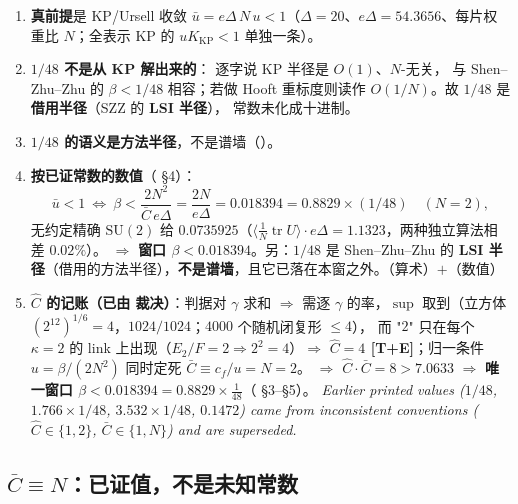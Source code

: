 \begin{enumerate}[label=(\alph*)]
\item \textbf{真前提}是 KP/Ursell 收敛 $\bar u=e\Delta\,N\,u<1$（$\Delta=20$、$e\Delta=54.3656$、每片权重比 $N$；全表示 KP 的 $uK_{\mathrm{KP}}<1$ 单独一条）。\LT
\item \textbf{$1/48$ 不是从 KP 解出来的}： 逐字说 KP 半径是 $O(1)$、$N$-无关，
与 Shen--Zhu--Zhu 的 $\beta<1/48$ 相容；若做 Hooft 重标度则读作 $O(1/N)$。故 $1/48$ 是\textbf{借用半径}（SZZ 的 \textbf{LSI 半径}），
常数未化成十进制。\LM
\item \textbf{$1/48$ 的语义是方法半径}，不是谱墙（）。\LT
\item \textbf{按已证常数的数值}（ \S4）：
\[
\bar u<1\ \Longleftrightarrow\ \beta<\frac{2N^2}{\bar C\,e\Delta}=\frac{2N}{e\Delta}=0.018394=0.8829\times(1/48)\quad(N=2),
\]
无约定精确 $\mathrm{SU}(2)$ 给 $0.0735925$（$\langle\tfrac1N\operatorname{tr}U\rangle\cdot e\Delta=1.1323$，两种独立算法相差 $0.02\%$）。
$\Rightarrow$ \textbf{窗口 $\beta<0.018394$}。另：$1/48$ 是 Shen--Zhu--Zhu 的 \textbf{LSI 半径}（借用的方法半径），\textbf{不是谱墙}，且它已落在本窗之外。\LT{}（算术）$+$\LE{}（数值）
\item \textbf{$\hat C$ 的记账（已由  裁决）}：判据对 $\gamma$ 求和 $\Rightarrow$ 需逐 $\gamma$ 的率，$\sup$ 取到（立方体 $(2^{12})^{1/6}=4$，$1024/1024$；$4000$ 个随机闭复形 $\le4$），
而 "$2$" 只在每个 $\kappa=2$ 的 link 上出现（$E_2/F=2\Rightarrow2^2=4$）$\Rightarrow$ \textbf{$\hat C=4$ [T+E]}；归一条件 $u=\beta/(2N^2)$ 同时定死 $\bar C\equiv c_f/u=N=2$。
$\Rightarrow$ $\hat C\cdot\bar C=8>7.0633$ $\Rightarrow$ \textbf{唯一窗口 $\beta<0.018394=0.8829\times\tfrac1{48}$}（ \S3--\S5）。
\emph{Earlier printed values ($1/48$, $1.766\times1/48$, $3.532\times1/48$, $0.1472$) came from inconsistent conventions ($\hat C\in\{1,2\}$, $\bar C\in\{1,N\}$) and are superseded.}\LM
\end{enumerate}
\subsection{$\bar C\equiv N$：\textbf{已证值}，不是未知常数}\label{sec:cbar}

